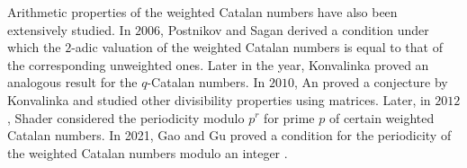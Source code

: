 \documentclass[12pt,notitlepage]{amsart}
\numberwithin{equation}{section}
\theoremstyle{thmstyleone}%
\theoremstyle{thmstyletwo}%
\theoremstyle{thmstylethree}%
\numberwithin{theorem}{section}
\numberwithin{equation}{section}
\begin{document}
Arithmetic properties of the weighted Catalan numbers have also been extensively studied. In $2006$, Postnikov and Sagan \cite{postnikov2007power} derived a condition under which the $2$-adic valuation of the weighted Catalan numbers is equal to that of the corresponding unweighted ones. Later in the year, Konvalinka \cite{konvalinka} proved an analogous result for the $q$-Catalan numbers. In $2010$, An \cite{ansthesis} proved a conjecture by Konvalinka and studied other divisibility properties using matrices. Later, in $2012$, Shader \cite{shader2013weighted} considered the periodicity modulo $p^r$ for prime $p$ of certain weighted Catalan numbers. In 2021, Gao and Gu proved a condition for the periodicity of the weighted Catalan numbers modulo an integer \cite[Theorem~4.2]{gaogu}.

\end{document}
